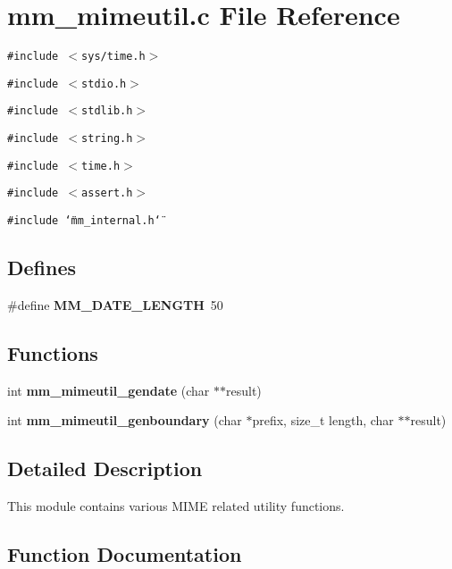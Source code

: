 \section{mm\_\-mimeutil.c File Reference}
\label{mm__mimeutil_8c}
{\tt \#include $<$sys/time.h$>$}\par
{\tt \#include $<$stdio.h$>$}\par
{\tt \#include $<$stdlib.h$>$}\par
{\tt \#include $<$string.h$>$}\par
{\tt \#include $<$time.h$>$}\par
{\tt \#include $<$assert.h$>$}\par
{\tt \#include \char`\"{}mm\_\-internal.h\char`\"{}}\par
\subsection*{Defines}
\begin{CompactItemize}
\item 
\#define \textbf{MM\_\-DATE\_\-LENGTH}~50\label{mm__mimeutil_8c_257774e1a30f8190b3d99891be64210a}

\end{CompactItemize}
\subsection*{Functions}
\begin{CompactItemize}
\item 
int {\bf mm\_\-mimeutil\_\-gendate} (char $\ast$$\ast$result)
\item 
int \textbf{mm\_\-mimeutil\_\-genboundary} (char $\ast$prefix, size\_\-t length, char $\ast$$\ast$result)\label{mm__mimeutil_8c_a72e503ba7ce2552456c6bd5935febe9}

\end{CompactItemize}


\subsection{Detailed Description}
This module contains various MIME related utility functions. 

\subsection{Function Documentation}
